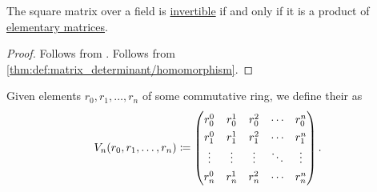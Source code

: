 \begin{proposition}\label{thm:product_of_elementary_matrices_iff_invertible}
  The square matrix over a field is \hyperref[def:inverse_matrix]{invertible} if and only if it is a product of \hyperref[def:elementary_matrix]{elementary matrices}.
\end{proposition}
\begin{proof}
  \SufficiencySubProof Follows from .
  \NecessitySubProof Follows from \cref{thm:def:matrix_determinant/homomorphism}.
\end{proof}

\begin{example}\label{ex:vandermonde_matrix}
  Given elements \( r_0, r_1, \ldots, r_n \) of some commutative ring, we define their  as
  \begin{equation*}
    \RenewDocumentCommand \arraystretch {} {1.3}
    V_n(r_0, r_1, \ldots, r_n)
    \coloneqq
    \begin{pmatrix}
      r_0^0  & r_0^1  & r_0^2  & \cdots & r_0^n  \\
      r_1^0  & r_1^1  & r_1^2  & \cdots & r_1^n  \\
      \vdots & \vdots & \vdots & \ddots & \vdots \\
      r_n^0  & r_n^1  & r_n^2  & \cdots & r_n^n
    \end{pmatrix}.
  \end{equation*}


\end{example}
